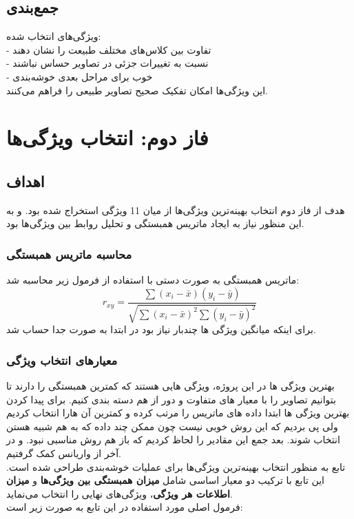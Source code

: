\documentclass[a4paper,12pt]{article}
\let\nobreaksection\section
\renewcommand{\section}{\nobreaksection}
\begin{document}
\subsection*{\textbf{جمع‌بندی}}
ویژگی‌های انتخاب شده:
\\
- تفاوت بین کلاس‌های مختلف طبیعت را نشان دهند
\\
- نسبت به تغییرات جزئی در تصاویر حساس نباشند
\\
- خوب برای مراحل بعدی خوشه‌بندی 
\\
این ویژگی‌ها امکان تفکیک صحیح تصاویر طبیعی را فراهم می‌کنند.
	
\section{فاز دوم: انتخاب ویژگی‌ها}

\subsection*{\textbf{اهداف}}
هدف از فاز دوم انتخاب بهینه‌ترین ویژگی‌ها از میان 11 ویژگی استخراج شده بود. و به این منظور نیاز به ایجاد ماتریس همبستگی و تحلیل روابط بین ویژگی‌ها بود.

\subsubsection*{\textbf{محاسبه ماتریس همبستگی}}
ماتریس همبستگی به صورت دستی با استفاده از فرمول زیر محاسبه شد:
\begin{equation}
r_{xy} = \frac{\sum (x_i - \bar{x})(y_i - \bar{y})}{\sqrt{\sum (x_i - \bar{x})^2 \sum (y_i - \bar{y})^2}}
\end{equation}
برای اینکه میانگین ویژگی ها چندبار نیاز بود در ابتدا به صورت جدا حساب شد.

\subsubsection*{\textbf{معیارهای انتخاب ویژگی}}
بهترین ویژگی ها در این پروژه، ویژگی هایی هستند که کمترین همبستگی را دارند تا بتوانیم تصاویر را با معیار های متفاوت و دور از هم دسته بندی کنیم.
برای پیدا کردن بهترین ویژگی ها ابتدا داده های ماتریس را مرتب کرده و کمترین آن هارا انتخاب کردیم ولی پی بردیم که این روش خوبی نیست چون ممکن چند داده که به هم شبیه هستن انتخاب شوند. بعد جمع این مقادیر را لحاظ کردیم که باز هم روش مناسبی نبود. و در آخر از واریانس کمک گرفتیم.
\\
تابع  به منظور انتخاب بهینه‌ترین ویژگی‌ها برای عملیات خوشه‌بندی طراحی شده است. این تابع با ترکیب دو معیار اساسی شامل \textbf{میزان همبستگی بین ویژگی‌ها} و \textbf{میزان اطلاعات هر ویژگی}، ویژگی‌های نهایی را انتخاب می‌نماید.
\\
فرمول اصلی مورد استفاده در این تابع به صورت زیر است:
\end{document}
